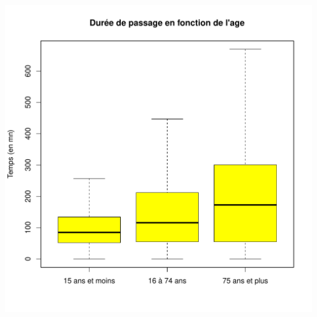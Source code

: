 \documentclass[12pt,english,french,twoside]{report}\usepackage[]{graphicx}\usepackage[]{color}
\makeatletter
\def\maxwidth{ %
  \ifdim\Gin@nat@width>\linewidth
    \linewidth
  \else
    \Gin@nat@width
  \fi
}
\newenvironment{knitrout}{}{} %
\makeatother
\begin{document}
\begin{knitrout}
\includegraphics[width=\maxwidth]{figure/duree_age2} 

\end{knitrout}
\end{document}
